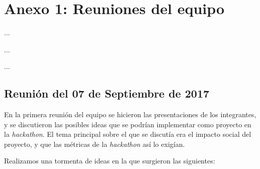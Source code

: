 %
%


\chapter{Anexo 1: Reuniones del equipo}
\label{ap1:Reuniones}

\begin{FraseCelebre}
\begin{Frase}
...
\end{Frase}
\begin{Fuente}
...
\end{Fuente}
\end{FraseCelebre}

\begin{resumen}
...
\end{resumen}

\section{Reunión del 07 de Septiembre de 2017}

En la primera reunión del equipo se hicieron las presentaciones de los integrantes, y se discutieron las posibles ideas que se podrían implementar como proyecto en la \textit{hackathon}.
El tema principal sobre el que se discutía era el impacto social del proyecto, y que las métricas de la \textit{hackathon} así lo exigían.

Realizamos una tormenta de ideas en la que surgieron las siguientes:

